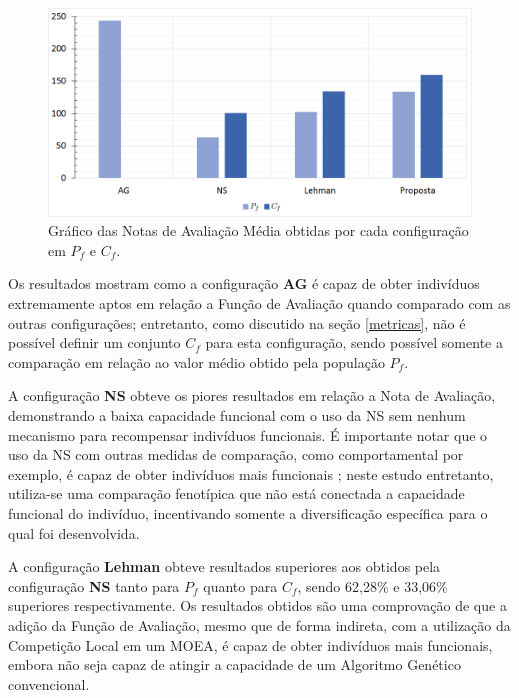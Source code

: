 \begin{figure}[htb]
	\begin{center}
		\includegraphics[width=1\textwidth]{Imagens/test_fitness.png}
		\caption{Gráfico das Notas de Avaliação Média obtidas por cada configuração em $P_f$ e $C_f$.}
		\label{fig:test_fitness}
	\end{center}
\end{figure}

Os resultados mostram como a configuração \textbf{AG} é capaz de obter indivíduos extremamente aptos em relação a Função de Avaliação quando comparado com as outras configurações; entretanto, como discutido na seção \ref{metricas}, não é possível definir um conjunto $C_f$ para esta configuração, sendo possível somente a comparação em relação ao valor médio obtido pela população $P_f$.

A configuração \textbf{NS} obteve os piores resultados em relação a Nota de Avaliação, demonstrando a baixa capacidade funcional com o uso da NS sem nenhum mecanismo para recompensar indivíduos funcionais. É importante notar que o uso da NS com outras medidas de comparação, como comportamental por exemplo, é capaz de obter indivíduos mais funcionais \cite{lehman2008exploiting} \cite{lehman2011abandoning}; neste estudo entretanto, utiliza-se uma comparação fenotípica que não está conectada a capacidade funcional do indivíduo, incentivando somente a diversificação específica para o qual foi desenvolvida.

A configuração \textbf{Lehman} obteve resultados superiores aos obtidos pela configuração \textbf{NS} tanto para $P_f$ quanto para $C_f$, sendo 62,28\% e 33,06\% superiores respectivamente. Os resultados obtidos são uma comprovação de que a adição da Função de Avaliação, mesmo que de forma indireta, com a utilização da Competição Local em um MOEA, é capaz de obter indivíduos mais funcionais, embora não seja capaz de atingir a capacidade de um Algoritmo Genético convencional.

